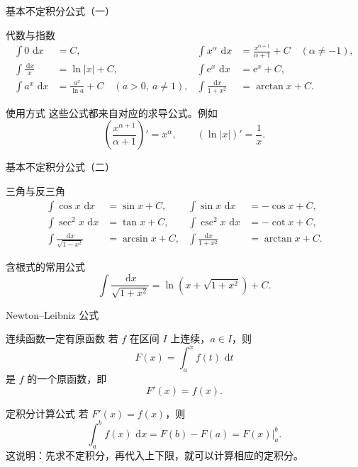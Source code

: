 \documentclass[aspectratio=169,10pt]{ctexbeamer}
\newcommand{\dd}{\,\mathrm{d}}
\newcommand{\ee}{\mathrm{e}}
\begin{document}
\begin{frame}[t]{基本不定积分公式（一）}
\small
\begin{block}{代数与指数}
\[
\begin{array}{rlrl}
\displaystyle \int 0\,\dd x&=C,&
\displaystyle \int x^\alpha\,\dd x&=\frac{x^{\alpha+1}}{\alpha+1}+C\quad(\alpha\ne-1),\\[2mm]
\displaystyle \int\frac{\dd x}{x}&=\ln|x|+C,&
\displaystyle \int \ee^x\,\dd x&=\ee^x+C,\\[2mm]
\displaystyle \int a^x\,\dd x&=\frac{a^x}{\ln a}+C\quad(a>0,\ a\ne1),&
\displaystyle \int\frac{\dd x}{1+x^2}&=\arctan x+C.
\end{array}
\]
\end{block}

\begin{block}{使用方式}
这些公式都来自对应的求导公式。例如
\[
  \left(\frac{x^{\alpha+1}}{\alpha+1}\right)'=x^\alpha,\qquad
  (\ln|x|)'=\frac1x.
\]
\end{block}
\end{frame}

\begin{frame}[t]{基本不定积分公式（二）}
\small
\begin{block}{三角与反三角}
\[
\begin{array}{rlrl}
\displaystyle \int\cos x\,\dd x&=\sin x+C,&
\displaystyle \int\sin x\,\dd x&=-\cos x+C,\\[2mm]
\displaystyle \int\sec^2x\,\dd x&=\tan x+C,&
\displaystyle \int\csc^2x\,\dd x&=-\cot x+C,\\[2mm]
\displaystyle \int\frac{\dd x}{\sqrt{1-x^2}}&=\arcsin x+C,&
\displaystyle \int\frac{\dd x}{1+x^2}&=\arctan x+C.
\end{array}
\]
\end{block}

\begin{block}{含根式的常用公式}
\[
  \int\frac{\dd x}{\sqrt{1+x^2}}
  =\ln\!\left(x+\sqrt{1+x^2}\right)+C.
\]
\end{block}
\end{frame}

\begin{frame}[t]{Newton--Leibniz 公式}
\small
\begin{block}{连续函数一定有原函数}
若 $f$ 在区间 $I$ 上连续，$a\in I$，则
\[
  F(x)=\int_a^x f(t)\,\dd t
\]
是 $f$ 的一个原函数，即
\[
  F'(x)=f(x).
\]
\end{block}

\begin{block}{定积分计算公式}
若 $F'(x)=f(x)$，则
\[
  \int_a^b f(x)\,\dd x
  =F(b)-F(a)
  =F(x)\bigg|_a^b.
\]
这说明：先求不定积分，再代入上下限，就可以计算相应的定积分。
\end{block}
\end{frame}
\end{document}
